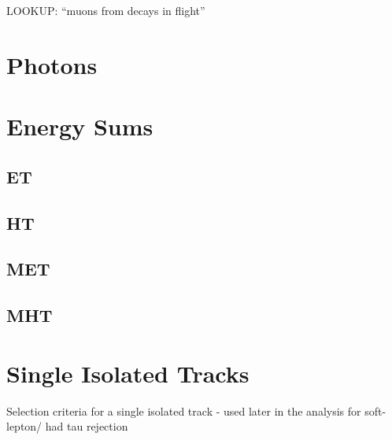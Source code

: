 LOOKUP: ``muons from decays in flight''

\section{Photons}  %
\label{sec:objects_photons}


\section{Energy Sums}  %
\label{sec:objects_energy_sums}

\subsection{ET}
\subsection{HT}
\subsection{MET}
\subsection{MHT}

\section{Single Isolated Tracks}  %
\label{sec:objects_sit}
Selection criteria for a single isolated track - used later in the analysis for soft-lepton/
had tau rejection